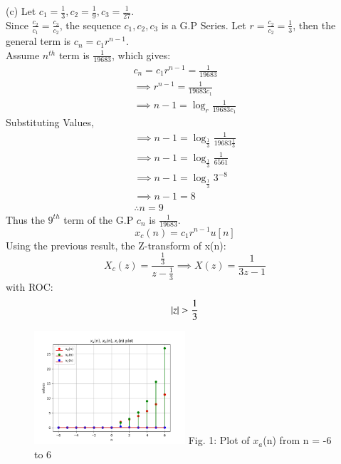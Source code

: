 \documentclass[journal,12pt,twocolumn]{IEEEtran}
\theoremstyle{remark}
\begin{document}
(c) Let $c_1 = \frac{1}{3}, c_2 = \frac{1}{9}, c_3 = \frac{1}{27}$.\\
Since $\frac{c_2}{c_1} = \frac{c_3}{c_2}$, the sequence $c_1, c_2, c_3$ is a G.P Series.
Let $r = \frac{c_2}{c_2} = \frac{1}{3}$, then the general term is $c_n = c_1 r^{n-1}$.\\
Assume $n^{th}$ term is $\frac{1}{19683}$, which gives: 
\begin{gather*}
    c_n = c_1 r^{n-1} = \frac{1}{19683}\\
    \implies r^{n-1} = \frac{1}{19683 c_1}\\
    \implies n - 1 = \log_{r}{\frac{1}{19683 c_1}}
\end{gather*}
Substituting Values,
\begin{gather*}
    \implies n - 1 = \log_{\frac{1}{3}}{\frac{1}{19683 \frac{1}{3}}}\\
    \implies n - 1 = \log_{\frac{1}{3}}{\frac{1}{6561}}\\
    \implies n - 1 = \log_{\frac{1}{3}}{3^{-8}}\\
    \implies n - 1 = 8\\
    \therefore n = 9
\end{gather*}
Thus the $9^{th}$ term of the G.P $c_n$ is $\frac{1}{19683}$.
\[ x_c(n) = c_1r^{n - 1}u[n] \]
Using the previous result, the Z-transform of x(n):
\[
    X_c(z) = \frac{\frac{1}{3}}{z - \frac{1}{3}}
    \implies X(z) = \frac{1 }{3z - 1}
\] with ROC: \[ \left\vert z\right\vert > \frac{1}{3} \]
\begin{figure}[h!]
    \centering
    \includegraphics[width=0.5\textwidth]{figs/a.png}
    Fig. 1: Plot of $x_a$(n) from n = -6 to 6
    \label{fig:img1}
\end{figure}
\end{document}
